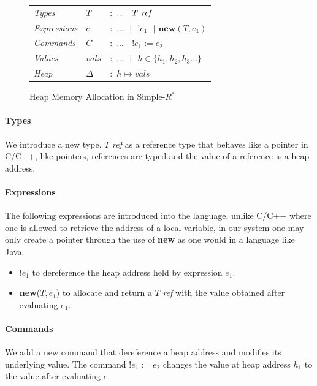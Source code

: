 \documentclass[a4paper,12pt]{report}
\begin{document}
\begin{figure}[H]
  \begin{center}
    \begin{tabular} {l l l}
      \textit{Types} & $T$ & $:$ $...\text{ }|\text{ }T\text{ \textit{ref }}$ \\
      \textit{Expressions} & $e$ & $:$ $...\text{ }|\text{ }!e_1\text{ }|\textbf{ new}(T, e_1)$\\
      \textit{Commands} & $C$ & $:$ $...$ $|$ $!e_1 := e_2$ \\
      \textit{Values} & $vals$& $:$ $...\text{ }|\text{ }h \in \{h_1,h_2, h_3...\} $ \\
      \textit{Heap} & $\Delta$& $:$ $h \mapsto vals$\\
    \end{tabular}
  \end{center}
  \caption{Heap Memory Allocation in Simple-$R^{*}$}
  \label{fig:ptr_syntax}
\end{figure}

\paragraph{Types}
We introduce a new type, $T$ \textit{ref} as a reference type that behaves like 
a pointer in C/C++, like pointers, references are typed and the value of a reference 
is a heap address. 

\paragraph{Expressions}
The following expressions are introduced into the language, unlike C/C++ 
where one is allowed to retrieve the address of a local variable, in our 
system one may only create a pointer through the use of \textbf{new} as 
one would in a language like Java.
\begin{itemize}
  \item $!e_1$ to dereference the heap address held by expression $e_1$.
  \item \textbf{new}($T, e_1$) to allocate and return a $T$ \textit{ref} with the 
  value obtained after evaluating $e_1$.
\end{itemize}

\paragraph{Commands}
We add a new command that dereference a heap address and modifies its underlying 
value. The command $!e_1 := e_2$ changes the value at heap address $h_1$ to the 
value after evaluating $e$.
\end{document}
